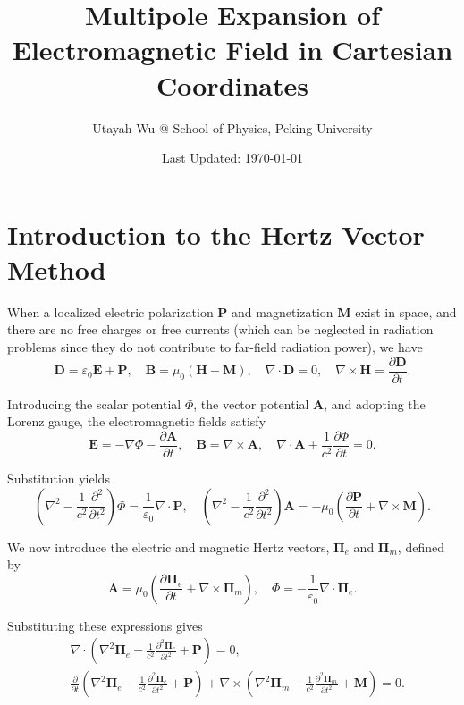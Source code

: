 \documentclass{article}
\begin{document}
	\title{Multipole Expansion of Electromagnetic Field in Cartesian Coordinates}
	\author{Utayah Wu @ School of Physics, Peking University}
	\date{\large Last Updated: \today}
	\maketitle
	\section{Introduction to the Hertz Vector Method}
	
	When a localized electric polarization $\bm{P}$ and magnetization $\bm{M}$ exist in space, and there are no free charges or free currents (which can be neglected in radiation problems since they do not contribute to far-field radiation power), we have
	\[
	\bm{D} = \varepsilon_0 \bm{E} + \bm{P}, \quad 
	\bm{B} = \mu_0 (\bm{H} + \bm{M}), \quad 
	\nabla \cdot \bm{D} = 0, \quad 
	\nabla \times \bm{H} = \frac{\partial \bm{D}}{\partial t}.
	\]
	
	Introducing the scalar potential $\Phi$, the vector potential $\bm{A}$, and adopting the Lorenz gauge, the electromagnetic fields satisfy
	\[
	\bm{E} = -\nabla \Phi - \frac{\partial \bm{A}}{\partial t}, \quad 
	\bm{B} = \nabla \times \bm{A}, \quad 
	\nabla \cdot \bm{A} + \frac{1}{c^2}\frac{\partial \Phi}{\partial t} = 0.
	\]
	
	Substitution yields
	\[
	\left( \nabla^2 - \frac{1}{c^2}\frac{\partial^2}{\partial t^2} \right) \Phi = \frac{1}{\varepsilon_0} \nabla \cdot \bm{P}, \quad 
	\left( \nabla^2 - \frac{1}{c^2}\frac{\partial^2}{\partial t^2} \right) \bm{A} = -\mu_0 \left( \frac{\partial \bm{P}}{\partial t} + \nabla \times \bm{M} \right).
	\]
	
	We now introduce the electric and magnetic Hertz vectors, $\bm{\Pi}_e$ and $\bm{\Pi}_m$, defined by
	\[
	\bm{A} = \mu_0 \left( \frac{\partial \bm{\Pi}_e}{\partial t} + \nabla \times \bm{\Pi}_m \right), \quad 
	\Phi = -\frac{1}{\varepsilon_0} \nabla \cdot \bm{\Pi}_e.
	\]
	
	Substituting these expressions gives
	\[
	\begin{split}
		&\nabla \cdot \left( \nabla^2 \bm{\Pi}_e - \frac{1}{c^2}\frac{\partial^2 \bm{\Pi}_e}{\partial t^2} + \bm{P} \right) = 0, \\
		&\frac{\partial}{\partial t} \left( \nabla^2 \bm{\Pi}_e - \frac{1}{c^2}\frac{\partial^2 \bm{\Pi}_e}{\partial t^2} + \bm{P} \right)
		+ \nabla \times \left( \nabla^2 \bm{\Pi}_m - \frac{1}{c^2}\frac{\partial^2 \bm{\Pi}_m}{\partial t^2} + \bm{M} \right) = 0.
	\end{split}
	\]
	
\end{document}
